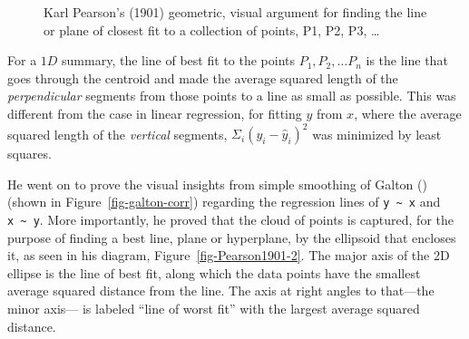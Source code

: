 \documentclass[
  letterpaper,
  10pt,
  krantz2]{krantz}
\begin{document}
\begin{figure}


\caption{\label{fig-Pearson1901}Karl Pearson's (1901) geometric, visual
argument for finding the line or plane of closest fit to a collection of
points, P1, P2, P3, \ldots{}}

\end{figure}%

For a \(1D\) summary, the line of best fit to the points
\(P_1, P_2, \dots P_n\) is the line that goes through the centroid and
made the average squared length of the \emph{perpendicular} segments
from those points to a line as small as possible. This was different
from the case in linear regression, for fitting \(y\) from \(x\), where
the average squared length of the \emph{vertical} segments,
\(\Sigma_i (y_i - \hat{y}_i)^2\) was minimized by least squares.

He went on to prove the visual insights from simple smoothing of Galton
() (shown in
Figure~\ref{fig-galton-corr}) regarding the regression lines of
\texttt{y\ \textasciitilde{}\ x} and \texttt{x\ \textasciitilde{}\ y}.
More importantly, he proved that the cloud of points is captured, for
the purpose of finding a best line, plane or hyperplane, by the
ellipsoid that encloses it, as seen in his diagram,
Figure~\ref{fig-Pearson1901-2}. The major axis of the 2D ellipse is the
line of best fit, along which the data points have the smallest average
squared distance from the line. The axis at right angles to that---the
minor axis--- is labeled ``line of worst fit'' with the largest average
squared distance.
\end{document}
